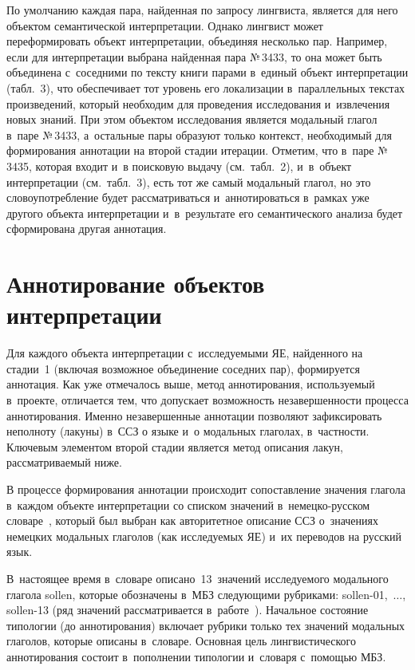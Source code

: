 \begin{multicols}{2}
  По умолчанию каждая пара, найденная по запро\-су лингвиста, является для 
него объектом семанти\-че\-ской интерпретации. Однако лингвист может
переформировать объект интерпретации, объединяя несколько пар. Например, 
если для интерпретации выбрана найденная пара №\,3433, то она может быть 
объединена с~соседними по текс\-ту книги парами в~единый объект 
интерпретации (табл.~3), что обеспечивает тот уровень его локализации 
в~параллельных текс\-тах произведений, который необходим для проведения 
исследования и~извлечения новых знаний. При этом объектом исследования 
является модальный глагол в~паре №\,3433, а~остальные пары образуют только 
контекст, необходимый для формирования аннотации на второй стадии 
итерации. Отметим, что в~паре №\,3435, которая входит и~в поисковую выдачу 
(см.\ табл.~2), и~в~объект интерпретации (см.\ табл.~3), есть тот же самый 
модальный глагол, но это словоупотребление будет рас\-смат\-ри\-вать\-ся 
и~аннотироваться в~рамках уже другого объекта интерпретации и~в~результате 
его семантического анализа будет сформирована другая аннотация.




\section{Аннотирование объектов интерпретации}
    
  Для каждого объекта интерпретации с~исследуемыми ЯЕ, найденного на 
стадии~1 (включая возможное объединение соседних пар), формируется\linebreak 
аннотация. Как уже отмечалось выше, метод анно\-ти\-ро\-ва\-ния, используемый 
в~проекте, отличается тем, что допускает возможность незавершенности\linebreak 
процесса аннотирования. Именно незавершенные аннотации позволяют 
зафиксировать неполноту (лакуны) в~ССЗ о языке и~о модальных глаголах, 
в~частности. Ключевым элементом второй стадии является метод описания 
лакун, рассматриваемый ниже.
  
  В процессе формирования аннотации происходит сопоставление значения 
глагола в~каждом объекте интерпретации со списком значений  
в~не\-мец\-ко-рус\-ском словаре~\cite{14-zat}, который был выбран как 
авторитетное описание ССЗ о~значениях немецких модальных глаголов (как 
исследуемых ЯЕ) и~их переводов на русский язык. 

В~на\-сто\-ящее время 
в~словаре описано~13~значений исследуемого модального глагола sollen, 
которые обозначены в~МБЗ следующими рубриками: sollen-01,\ $\ldots$,  
sollen-13 (ряд значений рассматривается в~работе~\cite{9-zat}). Начальное 
состояние типологии (до аннотирования) включает рубрики только тех 
значений модальных глаголов, которые описаны в~словаре. Основная цель 
лингвистического аннотирования со\-сто\-ит в~пополнении типологии и~словаря 
с~по\-мощью МБЗ.
  

\end{multicols}

